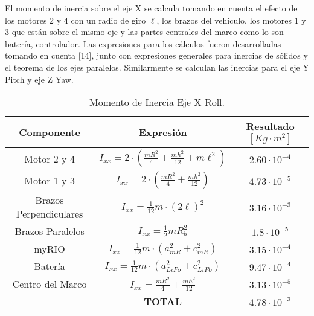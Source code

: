 \documentclass[../main.tex]{subfiles}
\begin{document}
El momento de inercia sobre el eje X se calcula tomando en cuenta el efecto
de los motores 2 y 4 con un radio de giro $\ell$, los brazos del vehículo, los motores 1 y 3 que están sobre
el mismo eje y las partes centrales del marco como lo son batería,
controlador. Las expresiones para los cálculos fueron desarrolladas tomando en cuenta [14], 
junto con expresiones generales para inercias de sólidos y el teorema de los ejes paralelos.
Similarmente se calculan las inercias para el eje Y Pitch y eje Z Yaw.

\textcompwordmark{}

\begin{table}[H]
\noindent \begin{centering}
\begin{tabular}{|c|c|c|}
\hline 
\textbf{Componente } & \textbf{Expresión} & \textbf{Resultado $[Kg\cdot m^2]$}\tabularnewline
\hline 
\hline 
Motor 2 y 4 & $I_{xx}=2\cdot(\frac{mR^{2}}{4}+\frac{mh^{2}}{12}+m\ell^{2})$ & $2.60\cdot10^{-4}$\tabularnewline
\hline 
Motor 1 y 3 & $I_{xx}=2\cdot(\frac{mR^{2}}{4}+\frac{mh^{2}}{12})$ & $4.73\cdot10^{-5}$\tabularnewline
\hline 
Brazos Perpendiculares & $I_{xx}=\frac{1}{12}m\cdot(2\ell)^{2}$ & $3.16\cdot10^{-3}$\tabularnewline
\hline 
Brazos Paralelos & $I_{xx}=\frac{1}{2}mR_{b}^{2}$ & $1.8\cdot10^{-5}$\tabularnewline
\hline 
myRIO & $I_{xx}=\frac{1}{12}m\cdot(a_{mR}^{2}+c_{mR}^{2})$ & $3.15\cdot10^{-4}$\tabularnewline
\hline 
Batería & $I_{xx}=\frac{1}{12}m\cdot(a_{LiPo}^{2}+c_{LiPo}^{2})$ & $9.47\cdot10^{-4}$\tabularnewline
\hline 
Centro del Marco & $I_{xx}=\frac{mR^{2}}{4}+\frac{mh^{2}}{12}$ & $3.13\cdot10^{-5}$\tabularnewline
\hline 
\multicolumn{1}{c|}{} & \textbf{TOTAL} & $4.78\cdot10^{-3}$\tabularnewline
\cline{2-3} 
\end{tabular}
\par\end{centering}
\caption{Momento de Inercia Eje X Roll.}
\end{table}
\end{document}
